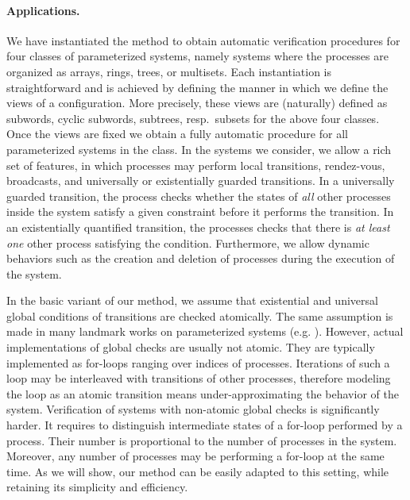 \paragraph{Applications.}
%
We have instantiated the method to obtain automatic verification
procedures for four classes of parameterized systems, namely
systems where the processes are organized as arrays, 
rings, trees, or multisets.
%
Each instantiation is straightforward and is achieved by defining
the manner in which we define the views of a configuration.
%
More precisely, these views are (naturally)  defined as
subwords, cyclic subwords, subtrees, resp.\ subsets for the
above four classes.
%
Once the views are fixed we obtain a fully 
automatic procedure for all parameterized systems in the class.
%
In the systems we consider, we allow a rich set of features, 
in which processes may perform local transitions, rendez-vous,
broadcasts, and universally or existentially guarded transitions.
%
In a universally guarded transition, the process checks whether the
states of {\it all} other processes inside the system satisfy a given
constraint before it performs the transition.
%
In an existentially quantified transition, the processes
checks that there is {\it at least one} other process
 satisfying the condition.
%
Furthermore, we allow dynamic behaviors such as
the creation and deletion of processes during 
the execution of the system.


In the basic variant of our method, we assume that existential and
universal global conditions of transitions are checked atomically.
%
The same assumption is made in many landmark works on parameterized
systems
(e.g. \cite{CTV06,PRZ-tacas01,BHV04,AJNO:simple,APRXZ01,Namjoshi:VMCAI07,rmc:wo:transducers}).
%
However, actual implementations of global checks are usually not
atomic.
%
They are typically implemented as for-loops ranging over indices of
processes.
%
Iterations of such a loop may be interleaved with transitions of other
processes, therefore modeling the loop as an atomic transition means
under-approximating the behavior of the system.
%
Verification of systems with non-atomic global checks is significantly
harder.
%
It requires to distinguish intermediate states of a for-loop performed
by a process. Their number is proportional to the number of processes
in the system.
%
Moreover, any number of processes may be performing a for-loop at the
same time.
%
%
As we will show, our method can be easily adapted to this setting,
while retaining its simplicity and efficiency.


